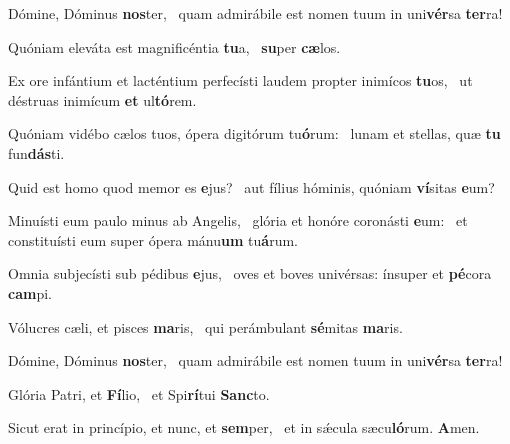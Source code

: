 \item Dómine, Dóminus \textbf{nos}ter,~\psstar{} quam admirábile est nomen tuum in uni\textbf{vér}sa \textbf{ter}ra!
\item Quóniam eleváta est magnificéntia \textbf{tu}a,~\psstar{} \textbf{su}per \textbf{cæ}los.
\item Ex ore infántium et lacténtium perfecísti laudem propter inimícos \textbf{tu}os,~\psstar{} ut déstruas inimícum \textbf{et} ul\textbf{tó}rem.
\item Quóniam vidébo cælos tuos, ópera digitórum tu\textbf{ó}rum:~\psstar{} lunam et stellas, quæ \textbf{tu} fun\textbf{dás}ti.
\item Quid est homo quod memor es \textbf{e}jus?~\psstar{} aut fílius hóminis, quóniam \textbf{ví}sitas \textbf{e}um?
\item Minuísti eum paulo minus ab Angelis,~\pscross{} glória et honóre coronásti \textbf{e}um:~\psstar{} et constituísti eum super ópera mánu\textbf{um} tu\textbf{á}rum.
\item Omnia subjecísti sub pédibus \textbf{e}jus,~\psstar{} oves et boves univérsas: ínsuper et \textbf{pé}cora \textbf{cam}pi.
\item Vólucres cæli, et pisces \textbf{ma}ris,~\psstar{} qui perámbulant \textbf{sé}mitas \textbf{ma}ris.
\item Dómine, Dóminus \textbf{nos}ter,~\psstar{} quam admirábile est nomen tuum in uni\textbf{vér}sa \textbf{ter}ra!
\item Glória Patri, et \textbf{Fí}lio,~\psstar{} et Spi\textbf{rí}tui \textbf{Sanc}to.
\item Sicut erat in princípio, et nunc, et \textbf{sem}per,~\psstar{} et in sǽcula sæcu\textbf{ló}rum. \textbf{A}men.
